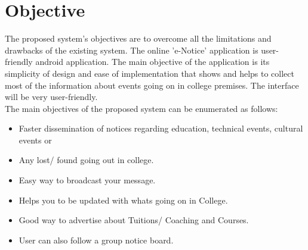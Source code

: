 \section{Objective}
The proposed system's objectives are to overcome all the limitations and drawbacks of the
existing system. The online 'e-Notice' application is user-friendly android application. The main
objective of the application is its simplicity of design and ease of implementation that shows and
helps to collect most of the information about events going on in college premises. The interface
will be very user-friendly. \\
The main objectives of the proposed system can be enumerated as follows:
\begin{itemize}
\item Faster dissemination of notices regarding education, technical events, cultural events or
\item Any lost/ found going out in college.
\item Easy way to broadcast your message.
\item Helps you to be updated with whats going on in College.
\item Good way to advertise about Tuitions/ Coaching and Courses.
\item User can also follow a group notice board.
\end{itemize}
